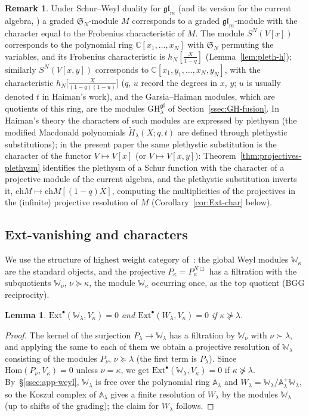 \documentclass[11pt]{amsart}
\numberwithin{equation}{section}
\newtheorem{lemma}[equation]{Lemma}
\theoremstyle{definition}
\newtheorem{remark}[equation]{Remark}
\newcommand{\gl}{\mathfrak{gl}}
\newcommand{\bW}{\mathbb{W}}          %
\newcommand{\bA}{\mathbb{A}}          %
\newcommand{\GH}{\mathrm{GH}}         %
\newcommand{\ch}{\mathrm{ch}}
\newcommand{\Hom}{\mathrm{Hom}}
\newcommand{\Ext}{\mathrm{Ext}}
\begin{document}
	\begin{remark}
		Under Schur--Weyl duality for $\gl_m$ (and its version for the current algebra, \cite[\S3]{KM}) a graded $\mathfrak S_N$-module $M$ corresponds to a graded $\gl_m$-module with the character equal to the Frobenius characteristic of $M$. The module $S^N(V[x])$ corresponds to the polynomial ring $\mathbb{C}[x_1,\dots,x_N]$ with $\mathfrak S_N$ permuting the variables, and its Frobenius characteristic is $h_N[\frac X{1-q}]$ (Lemma~\ref{lem:pleth-h}); similarly $S^N(V[x,y])$ corresponds to $\mathbb{C}[x_1,y_1,\dots,x_N,y_N]$, with the characteristic $h_N\big[\frac X{(1-q)(1-u)}\big]$ ($q$, $u$ record the degrees in $x$, $y$; $u$ is usually denoted $t$ in Haiman's work), and the Garsia--Haiman modules, which are quotients of this ring, are the modules $\GH^{\gl}_\lambda$ of Section~\ref{ssec:GH-fusion}. In Haiman's theory the characters of such modules are expressed by plethysm (the modified Macdonald polynomials $\widetilde H_\lambda(X;q,t)$ are defined through plethystic substitutions); in the present paper the same plethystic substitution is the character of the functor $V\mapsto V[x]$ (or $V\mapsto V[x,y]$): Theorem~\ref{thm:projectives-plethysm} identifies the plethysm of a Schur function with the character of a projective module of the current algebra, and the plethystic substitution inverts it, $\ch M\mapsto\ch M[(1-q)X]$, computing the multiplicities of the projectives in the (infinite) projective resolution of $M$ (Corollary~\ref{cor:Ext-char} below).
	\end{remark}
	
	\subsection{Ext-vanishing and characters}\label{ssec:app-Ext}
	
	We use the structure of highest weight category of~\cite{BBCKL,CI}: the global Weyl modules $\bW_\kappa$ are the standard objects, and the projective $P_\kappa=P^{N\Box}_\kappa$ has a filtration with the subquotients $\bW_\nu$, $\nu\succeq\kappa$, the module $\bW_\kappa$ occurring once, as the top quotient (BGG reciprocity).
	
	\begin{lemma}\label{lem:Ext-Weyl}
		$\Ext^\bullet(\bW_\lambda,V_\kappa)=0$ and $\Ext^\bullet(W_\lambda,V_\kappa)=0$ if $\kappa\not\succeq\lambda$.
	\end{lemma}
	\begin{proof}
		The kernel of the surjection $P_\lambda\to\bW_\lambda$ has a filtration by $\bW_\nu$ with $\nu\succ\lambda$, and applying the same to each of them we obtain a projective resolution of $\bW_\lambda$ consisting of the modules $P_\nu$, $\nu\succeq\lambda$ (the first term is $P_\lambda$). Since $\Hom(P_\nu,V_\kappa)=0$ unless $\nu=\kappa$, we get $\Ext^\bullet(\bW_\lambda,V_\kappa)=0$ if $\kappa\not\succeq\lambda$. By~\S\ref{ssec:app-weyl}, $\bW_\lambda$ is free over the polynomial ring $\bA_\lambda$ and $W_\lambda=\bW_\lambda/\bA_\lambda^+\bW_\lambda$, so the Koszul complex of $\bA_\lambda$ gives a finite resolution of $W_\lambda$ by the modules $\bW_\lambda$ (up to shifts of the grading); the claim for $W_\lambda$ follows.
	\end{proof}
	
\end{document}
